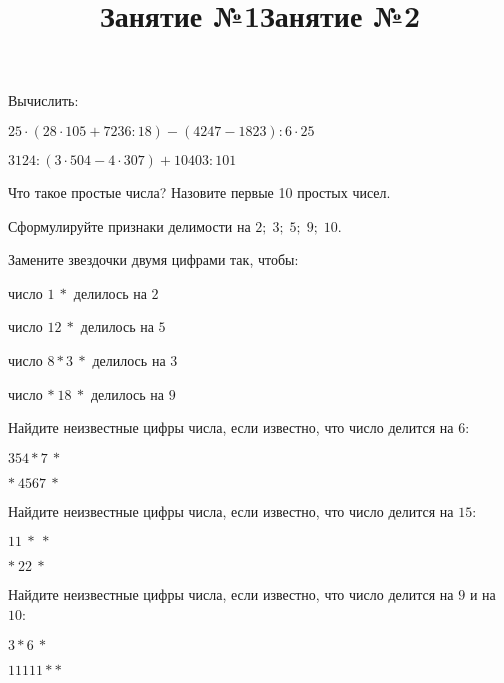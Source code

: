 \title{Занятие №1}
\begin{listofex}
	\item Вычислить:
	\begin{enumcols}[itemcolumns=2]
		\item \( 25\cdot(28\cdot105+7236:18)-(4247-1823):6\cdot25 \)
		\item \( 3124:(3\cdot504-4\cdot307)+10403:101 \)
	\end{enumcols}
	\item Что такое простые числа? Назовите первые 10 простых чисел.
	\item Сформулируйте признаки делимости на \( 2;\;3;\;5;\;9;\;10 \).
	\item Замените звездочки двумя цифрами так, чтобы:
	\begin{enumcols}[itemcolumns=2]
		\item число \( 1\:* \) делилось на \( 2 \)
		\item число \( 12\:* \) делилось на \( 5 \)
		\item число \( 8*3\:* \) делилось на \( 3 \)
		\item число \( *\:18\:* \) делилось на \( 9 \)
	\end{enumcols}
	\item Найдите неизвестные цифры числа, если известно, что число делится на \( 6 \):
	\begin{enumcols}[itemcolumns=2]
		\item \( 354*7\:* \)
		\item \( *\:4567\:* \)
	\end{enumcols}
	\item Найдите неизвестные цифры числа, если известно, что число делится на \( 15 \):
	\begin{enumcols}[itemcolumns=2]
		\item \( 11\:*\:* \)
		\item \( *\:22\:* \)
	\end{enumcols}
	\item Найдите неизвестные цифры числа, если известно, что число делится на \( 9 \) и на \( 10 \):
	\begin{enumcols}[itemcolumns=2]
		\item \( 3*6\:* \)
		\item \( 11111** \)
	\end{enumcols}
\end{listofex}
\title{Занятие №2}
